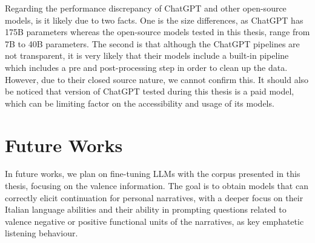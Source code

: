 Regarding the performance discrepancy of ChatGPT and other open-source models, is it likely due to two facts. One is the size differences, as ChatGPT has 175B parameters \cite{chatgpt-parameters} whereas the open-source models tested in this thesis, range from 7B to 40B parameters.
The second is that although the ChatGPT pipelines are not transparent, it is very likely that their models include a built-in pipeline which includes a pre and post-processing step in order to clean up the data. However, due to their closed source nature, we cannot confirm this. It should also be noticed that version of ChatGPT tested during this thesis is a paid model, which can be limiting factor on the accessibility and usage of its models.


\section{Future Works}
In future works, we plan on fine-tuning LLMs with the corpus presented in this thesis, focusing on the valence information. The goal is to obtain models that can correctly elicit continuation for personal narratives, with a deeper focus on their Italian language abilities and their ability in prompting questions related to valence negative or positive functional units of the narratives, as key emphatetic listening behaviour.
